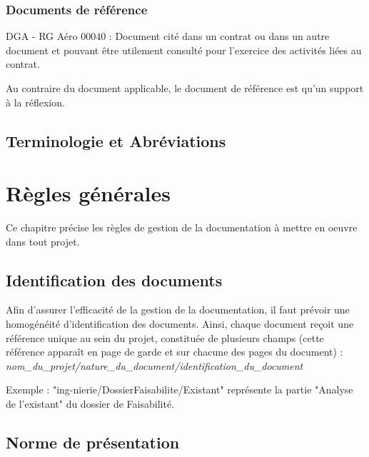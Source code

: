     \subsubsection{Documents de référence}
      DGA - RG Aéro 00040 : Document cité dans un contrat ou dans un autre document et pouvant être utilement consulté pour l'exercice des activités liées au contrat.
      \par Au contraire du document applicable, le document de référence est qu'un support à la réflexion. 
  \subsection{Terminologie et Abréviations}
\section{Règles générales}
Ce chapitre précise les règles de gestion de la documentation à mettre en oeuvre dans tout projet.
  \subsection{Identification des documents}
  Afin d’assurer l’efficacité de la gestion de la documentation, il faut prévoir une homogénéité d’identification des documents.
Ainsi, chaque document reçoit une référence unique au sein du projet, constituée de plusieurs champs (cette référence apparaît en page de garde et sur chacune des pages du document) :
\textit{nom\_du\_projet/nature\_du\_document/identification\_du\_document}

\par Exemple : "ing-nierie/DossierFaisabilite/Existant" représente la partie "Analyse de l'existant" du dossier de Faisabilité.

  \subsection{Norme de présentation}
